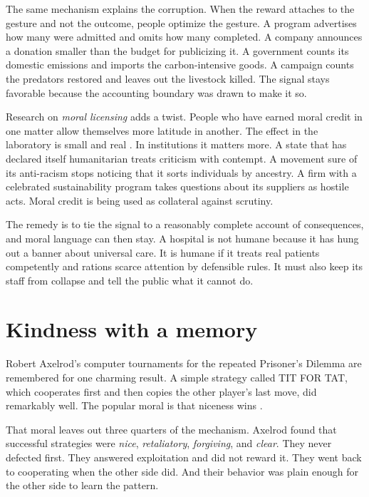 \documentclass[12pt,a4paper]{book}
\begin{document}
The same mechanism explains the corruption. When the reward attaches to the gesture and not the outcome, people optimize the gesture. A program advertises how many were admitted and omits how many completed. A company announces a donation smaller than the budget for publicizing it. A government counts its domestic emissions and imports the carbon-intensive goods. A campaign counts the predators restored and leaves out the livestock killed. The signal stays favorable because the accounting boundary was drawn to make it so.

Research on \emph{moral licensing} adds a twist. People who have earned moral credit in one matter allow themselves more latitude in another. The effect in the laboratory is small and real \cite{BlankenVanDeVenZeelenberg2015}. In institutions it matters more. A state that has declared itself humanitarian treats criticism with contempt. A movement sure of its anti-racism stops noticing that it sorts individuals by ancestry. A firm with a celebrated sustainability program takes questions about its suppliers as hostile acts. Moral credit is being used as collateral against scrutiny.

The remedy is to tie the signal to a reasonably complete account of consequences, and moral language can then stay. A hospital is not humane because it has hung out a banner about universal care. It is humane if it treats real patients competently and rations scarce attention by defensible rules. It must also keep its staff from collapse and tell the public what it cannot do.

\section{Kindness with a memory}

Robert Axelrod's computer tournaments for the repeated Prisoner's Dilemma are remembered for one charming result. A simple strategy called TIT FOR TAT, which cooperates first and then copies the other player's last move, did remarkably well. The popular moral is that niceness wins \cite{Axelrod-80a,Axelrod1390,Axelrod-85}.

That moral leaves out three quarters of the mechanism. Axelrod found that successful strategies were \emph{nice}, \emph{retaliatory}, \emph{forgiving}, and \emph{clear}. They never defected first. They answered exploitation and did not reward it. They went back to cooperating when the other side did. And their behavior was plain enough for the other side to learn the pattern.
\end{document}
